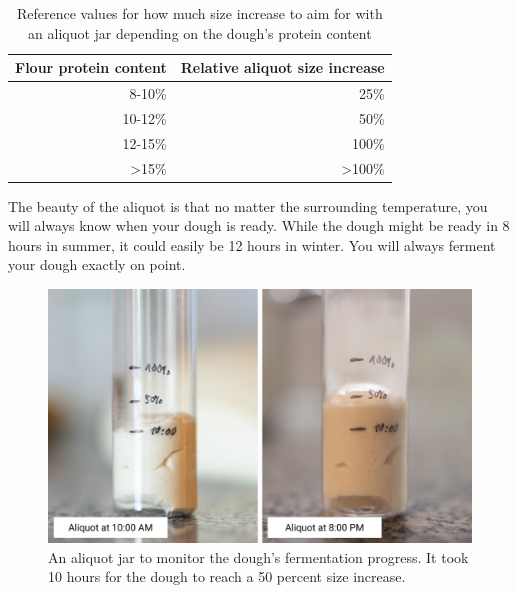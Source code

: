 \begin{table}[!htb]
  \begin{tabular}{|r|r|}
  \hline
  \multicolumn{1}{|l|}{\textbf{Flour protein content}} & \multicolumn{1}{l|}{\textbf{Relative aliquot size increase}} \\ \hline
  8-10\%                                               & 25\%                                                         \\ \hline
  10-12\%                                              & 50\%                                                         \\ \hline
  12-15\%                                              & 100\%                                                        \\ \hline
  \textgreater 15\%                                    & \textgreater 100\%                                           \\ \hline
  \end{tabular}
  \caption{Reference values for how much size increase to aim for with an aliquot jar depending on the dough's protein content}
\end{table}

The beauty of the aliquot is that no matter the surrounding
temperature, you will always know when your dough is ready.
While the dough might be ready in 8 hours in summer, it could
easily be 12 hours in winter. You will always ferment your
dough exactly on point.


\begin{figure}[!htb]
  \includegraphics[width=\textwidth]{aliquot-before-after}
  \caption{An aliquot jar to monitor the dough's fermentation progress.
  It took 10 hours for the dough to reach a 50 percent size increase.}
\end{figure}

